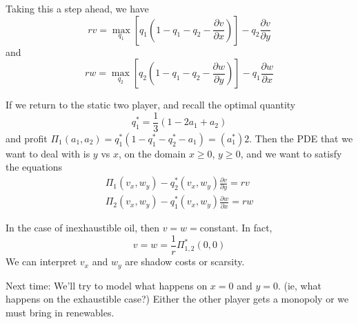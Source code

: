 Taking this a step ahead, we have
\begin{equation}
	rv = \max_{q_1} \left[ q_1(1-q_1-q_2-\frac{\partial v}{\partial x})\right]  - q_2 \frac{\partial v}{\partial y}
\end{equation}
and 
\begin{equation}
	rw = \max_{q_2} \left[ q_2(1-q_1-q_2-\frac{\partial w}{\partial y})\right]  - q_1 \frac{\partial w}{\partial x}
\end{equation}

If we return to the static two player, and recall the optimal quantity 
\begin{equation}
	q_1^* = \frac13 (1-2a_1+a_2)
\end{equation}
and profit $\Pi_1(a_1,a_2) = q_1^*(1-q_1^*-q_2^*-a_1) = (a_1^*)2$.
Then the PDE that we want to deal with is $y$ vs $x$, on the domain $x\geq 0$, $y\geq 0$, and we want to satisfy the equations
\begin{align}
	\Pi_1(v_x, w_y) - q_2^*(v_x, w_y) \frac{\partial v}{\partial y} = rv\\
	\Pi_2(v_x, w_y) - q_1^*(v_x, w_y) \frac{\partial w}{\partial x} = rw
\end{align}

In the case of inexhaustible oil, then $v=w=$constant. In fact,
\begin{equation}
	v=w=\frac{1}{r} \Pi_{1,2}^*(0,0)
\end{equation}
We can interpret $v_x$ and $w_y$ are shadow costs or scarsity.

Next time: We'll try to model what happens on $x=0$ and $y=0$. (ie, what happens on the exhaustible case?) Either the other player gets a monopoly or we must bring in renewables.









